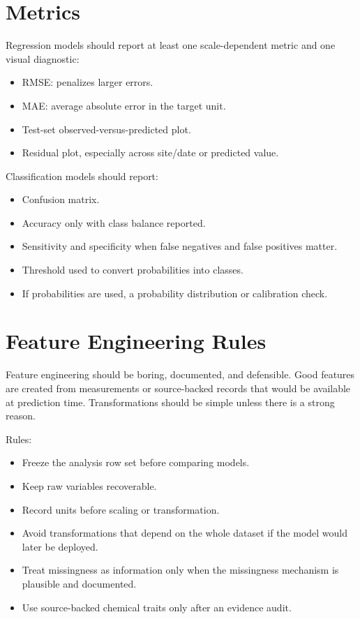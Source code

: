 \section{Metrics}

Regression models should report at least one scale-dependent metric and one visual diagnostic:
\begin{itemize}
  \item RMSE: penalizes larger errors.
  \item MAE: average absolute error in the target unit.
  \item Test-set observed-versus-predicted plot.
  \item Residual plot, especially across site/date or predicted value.
\end{itemize}

Classification models should report:
\begin{itemize}
  \item Confusion matrix.
  \item Accuracy only with class balance reported.
  \item Sensitivity and specificity when false negatives and false positives matter.
  \item Threshold used to convert probabilities into classes.
  \item If probabilities are used, a probability distribution or calibration check.
\end{itemize}

\section{Feature Engineering Rules}

Feature engineering should be boring, documented, and defensible. Good features are created from measurements or source-backed records that would be available at prediction time. Transformations should be simple unless there is a strong reason.

Rules:
\begin{itemize}
  \item Freeze the analysis row set before comparing models.
  \item Keep raw variables recoverable.
  \item Record units before scaling or transformation.
  \item Avoid transformations that depend on the whole dataset if the model would later be deployed.
  \item Treat missingness as information only when the missingness mechanism is plausible and documented.
  \item Use source-backed chemical traits only after an evidence audit.
\end{itemize}

